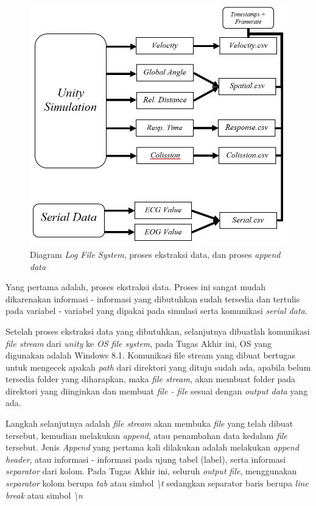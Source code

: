     \begin{figure} [!htb]
	    \captionsetup{justification=centering}
	    \includegraphics[scale=0.5]{img/logfile.JPG}
	    \caption{Diagram \textit{Log File System}, proses ekstraksi data, dan proses \textit{append data}}
	    \label{fig: 3_31}
    \end{figure}
    
    Yang pertama adalah, proses ekstraksi data. Proses ini sangat mudah dikarenakan informasi - informasi yang dibutuhkan sudah tersedia dan tertulis pada variabel - variabel yang dipakai pada simulasi serta komunikasi \textit{serial data}. 
    \par Setelah proses ekstraksi data yang dibutuhkan, selanjutnya dibuatlah komunikasi \textit{file stream} dari \textit{unity} ke \textit{OS file system}, pada Tugas Akhir ini, OS yang digunakan adalah Windows 8.1. Komunikasi file stream yang dibuat bertugas untuk mengecek apakah \textit{path} dari direktori yang dituju sudah ada, apabila belum tersedia folder yang diharapkan, maka \textit{file stream}, akan membuat folder pada direktori yang diinginkan dan membuat \textit{file - file} sesuai dengan \textit{output data} yang ada.
    \par Langkah selanjutnya adalah \textit{file stream} akan membuka \textit{file} yang telah dibuat tersebut, kemudian melakukan \textit{append}, atau penambahan data kedalam \textit{file} tersebut. Jenis \textit{Append} yang pertama kali dilakukan adalah melakukan \textit{append header}, atau informasi - informasi pada ujung tabel (label), serta informasi \textit{separator} dari kolom. Pada Tugas Akhir ini, seluruh \textit{output file}, menggunakan \textit{separator} kolom berupa \textit{tab} atau simbol \textit{\textbackslash t} sedangkan separator baris berupa \textit{line break} atau simbol \textit{\textbackslash n}
    

